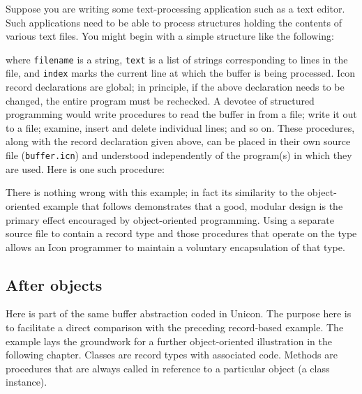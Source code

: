 Suppose you are writing some text-processing application such as a text
editor. Such applications need to be able to process
structures holding the contents of various text files. You might begin
with a simple structure like the following: 


\noindent
where \texttt{filename} is a string, \texttt{text} is a list of strings
corresponding to lines in the file, and \texttt{index} marks
the current line at which the buffer is being processed. Icon record
declarations are global; in principle, if the above declaration needs
to be changed, the entire program must be rechecked. A devotee of
structured programming would write procedures to read the buffer
in from a file; write it out to a file; examine, insert and delete
individual lines; and so on. These procedures, along with the record
declaration given above, can be placed in their own source file
(\texttt{buffer.icn}) and understood independently of the program(s) in
which they are used. Here is one such procedure: 


There is nothing wrong with this example; in fact its similarity to the
object-oriented example that follows demonstrates that a good, modular
design is the primary effect encouraged by object-oriented programming. Using a separate source file
to contain a record type and those procedures that operate on the type
allows an Icon programmer to maintain a voluntary encapsulation of that
type. 

\subsection*{After objects}

Here is part of the same buffer abstraction coded in Unicon. The
purpose here is to facilitate a direct comparison with the preceding
record-based example. The example lays the groundwork for a
further object-oriented illustration in the following
chapter. Classes are record types with associated code.
Methods are procedures that are always called in
reference to a particular object (a class instance).

